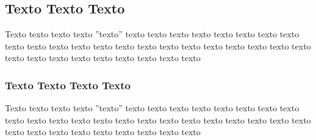 \subsection{Texto Texto Texto}

Texto texto texto texto ''texto'' texto texto texto texto texto texto texto texto texto texto texto texto texto texto texto texto texto texto texto texto texto texto texto texto texto texto texto texto texto texto texto


\subsubsection{Texto Texto Texto Texto}

Texto texto texto texto ''texto'' texto texto texto texto texto texto texto texto texto texto texto texto texto texto texto texto texto texto texto texto texto texto texto texto texto texto texto texto texto texto texto
